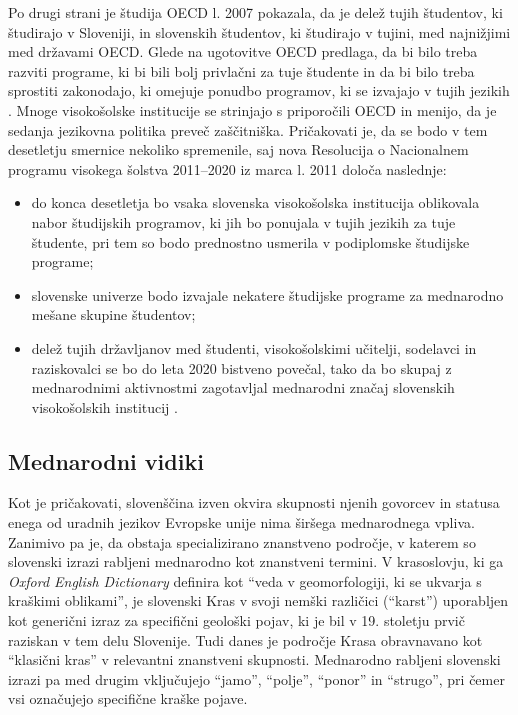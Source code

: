 \begin{multicols}{2}
Po drugi strani je študija OECD l. 2007 pokazala, da je delež tujih študentov, ki študirajo v Sloveniji, in slovenskih študentov, ki študirajo v tujini, med naj\-nižjimi med državami OECD. Glede na ugotovitve OECD predlaga, da bi bilo treba razviti programe, ki bi bili bolj privlačni za tuje študente in da bi bilo treba sprostiti zako\-nodajo, ki omejuje ponudbo programov, ki se izvajajo v tujih jezikih \cite{OECD1}. Mnoge visokošolske institucije se strinjajo s priporočili OECD in menijo, da je sedanja jezikovna politika preveč zaščitniška. 
Pričakovati je, da se bodo v tem desetletju smernice nekoliko spremenile, saj nova Resolucija o Nacionalnem programu visokega šolstva 2011–2020 iz marca l. 2011 določa naslednje: 
\begin{itemize}
\item do konca desetletja bo vsaka slovenska visokošolska institucija oblikovala nabor študijskih programov, ki jih bo ponujala v tujih jezikih za tuje študente, pri tem so bodo prednostno usmerila v podiplomske študijske programe;
\item slovenske univerze bodo izvajale nekatere študijske programe za mednarodno mešane skupine študentov;
\item delež tujih držav\-ljanov med študenti, visokošolskimi učitelji, sodelavci in raziskovalci se bo do leta 2020 bistveno povečal, tako da bo skupaj z mednarodnimi aktivnostmi zagotav\-ljal mednarodni značaj slovenskih visokošolskih institucij \cite{UradniList1}.
\end{itemize}

\subsection{Mednarodni vidiki}

Kot je pričakovati, slovenščina izven okvira skupnosti njenih go\-vorcev in statusa enega od uradnih jezikov Evropske unije nima širšega mednarodnega vpliva. Zanimivo pa je, da obstaja specializirano znanstveno področje, v katerem so slovenski izrazi rab\-ljeni mednarodno kot znanstveni termini. V krasoslovju, ki ga \textit{Oxford English Dictionary} definira kot “veda v geomorfologiji, ki se ukvarja s kraškimi oblikami”, je slovenski Kras v svoji nemški različici (“karst”) uporab\-ljen kot generični izraz za specifični geološki pojav, ki je bil v 19. stoletju prvič raziskan v tem delu Slovenije. Tudi danes je področje Krasa obravnavano kot “klasični kras” v rele\-vantni znanstveni skupnosti. Mednarodno rab\-ljeni slovenski izrazi pa med drugim vključujejo “jamo”, “polje”, “ponor” in “strugo”, pri čemer vsi označujejo specifične kraške pojave.


\end{multicols}
